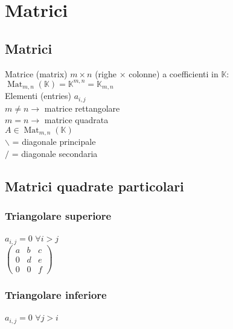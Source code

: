 \documentclass[a4paper, twoside, italian, 11pt]{book}
\DeclareMathOperator{\Mat}{Mat}
\newcommand{\K}{\mathbb K}
\begin{document}
\chapter{Matrici}



\section {Matrici}

Matrice (matrix) $m \times n$ (righe $\times$ colonne) a coefficienti in $\K$: \\
$\Mat_{m,n}(\K) = \K^{m,n} = \K_{m,n}$ \\

\noindent
Elementi (entries) $a_{i, j}$ \\

\noindent
$m \neq n \rightarrow$ matrice rettangolare \\
$m = n \rightarrow$ matrice quadrata \\

\noindent
$A \in \Mat_{m,n}(\K)$ \\

\noindent
$\backslash$ = diagonale principale \\
$/$ = diagonale secondaria \\



\section{Matrici quadrate particolari}


\subsection{Triangolare superiore}

$a_{i,j} = 0$ $\forall i > j$ \\

\noindent
$\begin{pmatrix}
a & b & c \\
0 & d & e \\
0 & 0 & f
\end{pmatrix}$


\subsection{Triangolare inferiore}

$a_{i,j} = 0$ $\forall j > i$ \\
\end{document}
